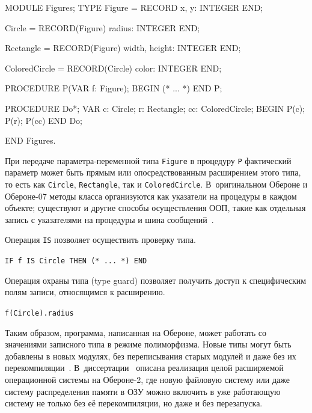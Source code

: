 \documentclass[utf8]{lgu}
\newcommand{\code}[1]{{\normalsize\texttt{#1}}}
\begin{document}
\begin{listing}[H]
\caption{Расширение записных типов в Обероне}
\label{lst:OberonRecordExtensions}
\vspace{-17pt}
\begin{modula2}
MODULE Figures;
TYPE
  Figure = RECORD
    x, y: INTEGER
  END;

  Circle = RECORD(Figure)
    radius: INTEGER
  END;

  Rectangle = RECORD(Figure)
    width, height: INTEGER
  END;

  ColoredCircle = RECORD(Circle)
    color: INTEGER
  END;

PROCEDURE P(VAR f: Figure);
BEGIN
  (* ... *)
END P;

PROCEDURE Do*;
VAR
  c: Circle;
  r: Rectangle;
  cc: ColoredCircle;
BEGIN
  P(c);
  P(r);
  P(cc)
END Do;

END Figures.
\end{modula2}
\end{listing}

При передаче параметра-переменной типа \code{Figure} в процедуру \code{P} фактический параметр может быть прямым или опосредствованным расширением этого типа, то есть как \code{Circle}, \code{Rectangle}, так и \code{ColoredCircle}. В~оригинальном Обероне и Обероне-07 методы класса организуются как указатели на процедуры в каждом объекте; существуют и другие способы осуществления ООП, такие как отдельная запись с указателями на процедуры и шина сообщений~\cite[с.~59]{WirthProgramming}.

Операция \code{IS} позволяет осуществить проверку типа.

\begin{center}
\code{IF f IS Circle THEN  (* ... *)  END}
\end{center}

Операция охраны типа (type guard) позволяет получить доступ к специфическим полям записи, относящимся к расширению.

\begin{center}
\code{f(Circle).radius}
\end{center}

Таким образом, программа, написанная на Обероне, может работать со значениями записного типа в режиме полиморфизма. Новые типы могут быть добавлены в новых модулях, без переписывания старых модулей и даже без их перекомпиляции~\cite[с.~167]{WirthPIO}. В~диссертации~\cite{ETHOS} описана реализация целой расширяемой операционной системы на Обероне‑2, где новую файловую систему или даже систему распределения памяти в ОЗУ можно включить в уже работающую систему не только без её перекомпиляции, но даже и без перезапуска.
\end{document}
